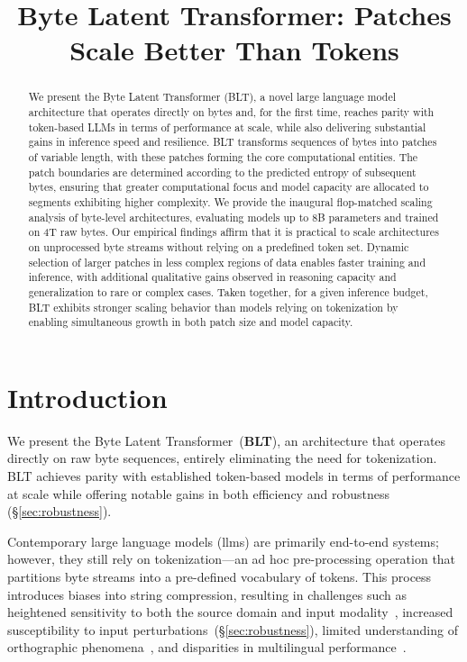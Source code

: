 \title{Byte Latent Transformer: Patches Scale Better Than Tokens}

\begin{abstract}
We present the Byte Latent Transformer (\textsc{BLT}), a novel large language model architecture that operates directly on bytes and, for the first time, reaches parity with token-based LLMs in terms of performance at scale, while also delivering substantial gains in inference speed and resilience. \textsc{BLT} transforms sequences of bytes into patches of variable length, with these patches forming the core computational entities. The patch boundaries are determined according to the predicted entropy of subsequent bytes, ensuring that greater computational focus and model capacity are allocated to segments exhibiting higher complexity. We provide the inaugural flop-matched scaling analysis of byte-level architectures, evaluating models up to 8B parameters and trained on 4T raw bytes. Our empirical findings affirm that it is practical to scale architectures on unprocessed byte streams without relying on a predefined token set. Dynamic selection of larger patches in less complex regions of data enables faster training and inference, with additional qualitative gains observed in reasoning capacity and generalization to rare or complex cases. Taken together, for a given inference budget, \textsc{BLT} exhibits stronger scaling behavior than models relying on tokenization by enabling simultaneous growth in both patch size and model capacity.
\end{abstract}

\section{Introduction}
\label{section:intro}

We present the Byte Latent Transformer~(\textbf{BLT}), an architecture that operates directly on raw byte sequences, entirely eliminating the need for tokenization. BLT achieves parity with established token-based models in terms of performance at scale while offering notable gains in both efficiency and robustness (\S\ref{sec:robustness}). 

Contemporary large language models (llms) are primarily end-to-end systems; however, they still rely on tokenization—an ad hoc pre-processing operation that partitions byte streams into a pre-defined vocabulary of tokens. This process introduces biases into string compression, resulting in challenges such as heightened sensitivity to both the source domain and input modality~\citep{dagangetting}, increased susceptibility to input perturbations~(\S\ref{sec:robustness}), limited understanding of orthographic phenomena~\citep{edman2024cute}, and disparities in multilingual performance~\citep{liang2023xlm,petrov2024language,limisiewicz2024myte}.


